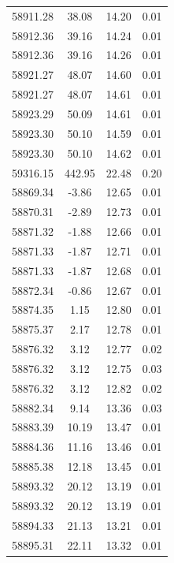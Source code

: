 \begin{longtable}{|c|c|c|c|}
 58911.28 &   38.08 &       14.20 &          0.01 \\
 58912.36 &   39.16 &       14.24 &          0.01 \\
 58912.36 &   39.16 &       14.26 &          0.01 \\
 58921.27 &   48.07 &       14.60 &          0.01 \\
 58921.27 &   48.07 &       14.61 &          0.01 \\
 58923.29 &   50.09 &       14.61 &          0.01 \\
 58923.30 &   50.10 &       14.59 &          0.01 \\
 58923.30 &   50.10 &       14.62 &          0.01 \\
 59316.15 &  442.95 &       22.48 &          0.20 \\
 58869.34 &   -3.86 &       12.65 &          0.01 \\
 58870.31 &   -2.89 &       12.73 &          0.01 \\
 58871.32 &   -1.88 &       12.66 &          0.01 \\
 58871.33 &   -1.87 &       12.71 &          0.01 \\
 58871.33 &   -1.87 &       12.68 &          0.01 \\
 58872.34 &   -0.86 &       12.67 &          0.01 \\
 58874.35 &    1.15 &       12.80 &          0.01 \\
 58875.37 &    2.17 &       12.78 &          0.01 \\
 58876.32 &    3.12 &       12.77 &          0.02 \\
 58876.32 &    3.12 &       12.75 &          0.03 \\
 58876.32 &    3.12 &       12.82 &          0.02 \\
 58882.34 &    9.14 &       13.36 &          0.03 \\
 58883.39 &   10.19 &       13.47 &          0.01 \\
 58884.36 &   11.16 &       13.46 &          0.01 \\
 58885.38 &   12.18 &       13.45 &          0.01 \\
 58893.32 &   20.12 &       13.19 &          0.01 \\
 58893.32 &   20.12 &       13.19 &          0.01 \\
 58894.33 &   21.13 &       13.21 &          0.01 \\
 58895.31 &   22.11 &       13.32 &          0.01 \\

\end{longtable}
